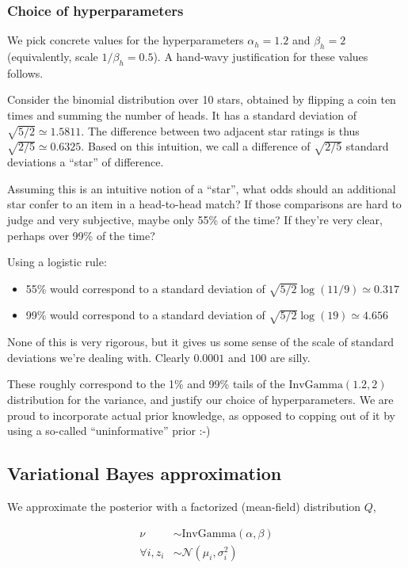 \documentclass[12pt]{article}
\begin{document}
    \subsubsection{Choice of hyperparameters}
    We pick concrete values for the hyperparameters $\alpha_h = 1.2$ and $\beta_h = 2$
    (equivalently, scale $1/\beta_h = 0.5$). A hand-wavy justification for these values follows.

    Consider the binomial distribution over 10 stars, obtained by flipping a coin
    ten times and summing the number of heads. It has a standard deviation of
    $\sqrt{5/2} \simeq 1.5811$. The difference between two adjacent star ratings is thus
    $\sqrt{2/5} \simeq 0.6325$. Based on this intuition, we call a difference of $\sqrt{2/5}$ standard deviations
    a ``star'' of difference.

    Assuming this is an intuitive notion of a ``star'', what odds
    should an additional star confer to an item in a head-to-head match?
    If those comparisons are hard to judge and very subjective, maybe only 55\% of the time?
    If they're very clear, perhaps over 99\% of the time?

    Using a logistic rule:
    \begin{itemize}
    \item 55\% would correspond to a standard deviation of $\sqrt{5/2} \log(11/9) \simeq 0.317$
    \item 99\% would correspond to a standard deviation of $\sqrt{5/2} \log(19) \simeq 4.656$
    \end{itemize}

    None of this is very rigorous, but it gives us some sense of the scale
    of standard deviations we're dealing with. Clearly $0.0001$ and $100$ are silly.

    These roughly correspond to the 1\% and 99\% tails of the
    $\text{InvGamma}(1.2, 2)$ distribution for the variance, and justify our choice of hyperparameters.
    We are proud to incorporate actual prior knowledge, as opposed
    to copping out of it by using a so-called ``uninformative'' prior :-)

\subsection{Variational Bayes approximation}

We approximate the posterior with a factorized (mean-field) distribution $Q$,

\begin{equation}
    \begin{aligned}
        \nu &\sim \text{InvGamma}(\alpha, \beta) \\
        \forall i, z_i &\sim \mathcal{N}(\mu_i, \sigma_i^2) \\
    \end{aligned}
\end{equation}
\end{document}
